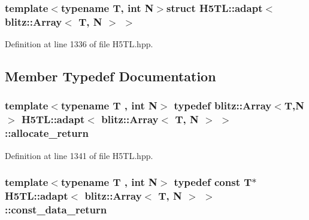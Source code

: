 \subsubsection*{template$<$typename T, int N$>$struct H5\-T\-L\-::adapt$<$ blitz\-::\-Array$<$ T, N $>$ $>$}



Definition at line 1336 of file H5\-T\-L.\-hpp.



\subsection{Member Typedef Documentation}
\hypertarget{struct_h5_t_l_1_1adapt_3_01blitz_1_1_array_3_01_t_00_01_n_01_4_01_4_a36fe01410b3795e22c6841dc5b616191}{
\subsubsection[{allocate\-\_\-return}]{\setlength{\rightskip}{0pt plus 5cm}template$<$typename T , int N$>$ typedef blitz\-::\-Array$<$T,N$>$ {\bf H5\-T\-L\-::adapt}$<$ blitz\-::\-Array$<$ T, N $>$ $>$\-::{\bf allocate\-\_\-return}}}\label{struct_h5_t_l_1_1adapt_3_01blitz_1_1_array_3_01_t_00_01_n_01_4_01_4_a36fe01410b3795e22c6841dc5b616191}


Definition at line 1341 of file H5\-T\-L.\-hpp.

\hypertarget{struct_h5_t_l_1_1adapt_3_01blitz_1_1_array_3_01_t_00_01_n_01_4_01_4_add4a9236bffd7861aa0bb5972c78221f}{
\subsubsection[{const\-\_\-data\-\_\-return}]{\setlength{\rightskip}{0pt plus 5cm}template$<$typename T , int N$>$ typedef const T$\ast$ {\bf H5\-T\-L\-::adapt}$<$ blitz\-::\-Array$<$ T, N $>$ $>$\-::{\bf const\-\_\-data\-\_\-return}}}\label{struct_h5_t_l_1_1adapt_3_01blitz_1_1_array_3_01_t_00_01_n_01_4_01_4_add4a9236bffd7861aa0bb5972c78221f}


